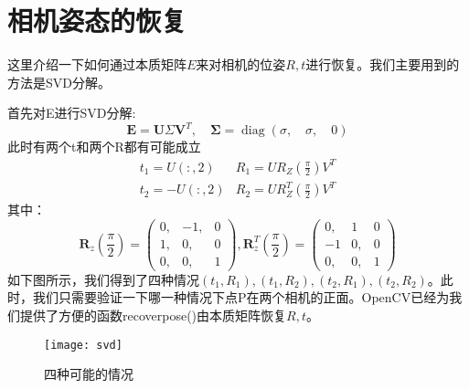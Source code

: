 \section{相机姿态的恢复}
这里介绍一下如何通过本质矩阵$E$来对相机的位姿$R,t$进行恢复。我们主要用到的方法是SVD分解\cite{multiview}。\par
首先对E进行SVD分解:
\begin{equation}
\boldsymbol{E}=\boldsymbol{U} \Sigma \boldsymbol{V}^{T}, \quad \boldsymbol{\Sigma}=\operatorname{diag}(\sigma, \quad \sigma, \quad 0)
\end{equation}
此时有两个t和两个R都有可能成立
\begin{equation}
\begin{array}{cc}
{t_{1}=U( :, 2)} & {R_{1}=U R_{Z}\left(\frac{\pi}{2}\right) V^{T}} \\
{t_{2}=-U( :, 2)} & {R_{2}=U R_{Z}^{T}\left(\frac{\pi}{2}\right) V^{T}}
\end{array}
\end{equation}
其中：
\begin{equation}
\boldsymbol{R}_{z}\left(\frac{\pi}{2}\right)=\left( \begin{array}{ccc}{0,} & {-1,} & {0} \\ {1,} & {0,} & {0} \\ {0,} & {0,} & {1}\end{array}\right), \boldsymbol{R}_{z}^{T}\left(\frac{\pi}{2}\right)=\left( \begin{array}{ccc}{0,} & {1} & {0} \\ {-1} & {0,} & {0} \\ {0,} & {0,} & {1}\end{array}\right)
\end{equation}
如下图所示，我们得到了四种情况$(t_1,R_1),(t_1,R_2),(t_2,R_1),(t_2,R_2)$。此时，我们只需要验证一下哪一种情况下点P在两个相机的正面。OpenCV已经为我们提供了方便的函数recoverpose()由本质矩阵恢复$R,t$。
\begin{figure}[H]
	\centering
	\texttt{[image: svd]}
	\caption{四种可能的情况}
\end{figure}






















